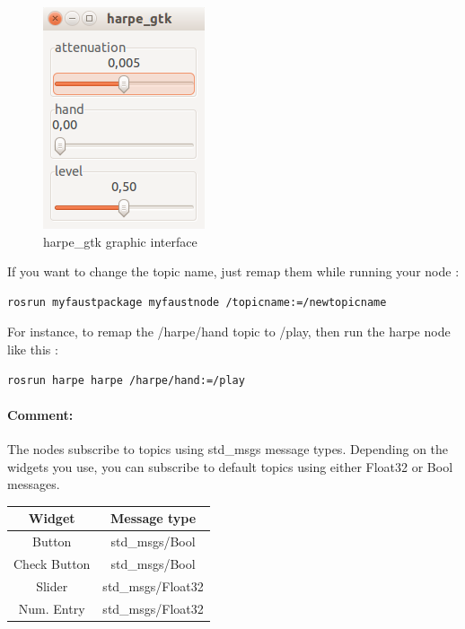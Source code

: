 \begin{figure}[ht!]
\centering
\begin{adjustbox}{minipage=5cm,margin=0pt 10pt,bgcolor=roscolor}
\centering
\includegraphics[scale=0.5]{images/harpe_gtk.png}
\end{adjustbox}
\caption{harpe\_gtk graphic interface}
\label{fig:harpe_gtk}
\end{figure}

If you want to change the topic name, just remap them while running your node :
\begin{lstlisting}
rosrun myfaustpackage myfaustnode /topicname:=/newtopicname
\end{lstlisting}
For instance, to remap the /harpe/hand topic to /play, then run the harpe node like this :
\begin{lstlisting}
rosrun harpe harpe /harpe/hand:=/play
\end{lstlisting}

\paragraph{Comment:}The \faust nodes subscribe to topics using std\_msgs message types. Depending on the widgets you use, you can subscribe to default topics using either Float32 or Bool messages.\\

\begin{center}
	\begin{tabular}{ | c | c | }
		\hline
		\rowcolor{yobg} Widget & Message type \\ \hline
		Button & std\_msgs/Bool \\ \hline
		Check Button & std\_msgs/Bool \\ \hline
		Slider & std\_msgs/Float32 \\ \hline
		Num. Entry & std\_msgs/Float32 \\ \hline
	\end{tabular}
\end{center}

